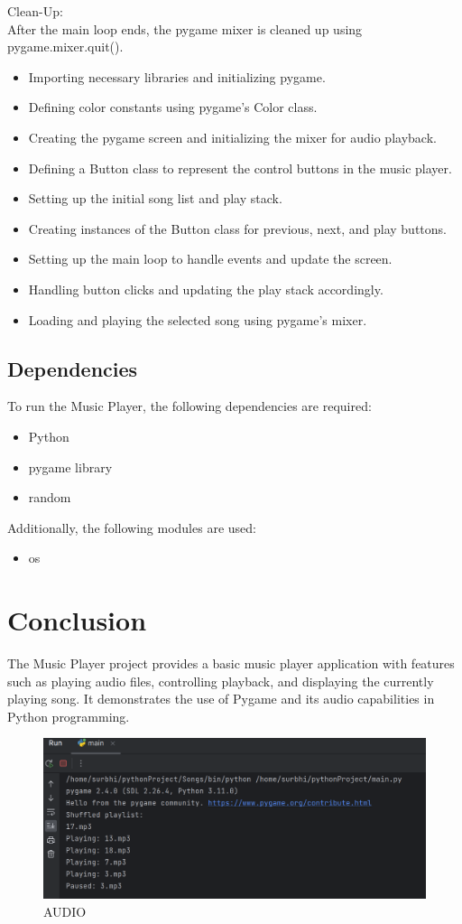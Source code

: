 \documentclass[journal,12pt,twocolumn]{IEEEtran}
\begin{document}
Clean-Up:\\
After the main loop ends, the pygame mixer is cleaned up using pygame.mixer.quit().

\begin{itemize}
\item Importing necessary libraries and initializing pygame.
\item Defining color constants using pygame's Color class.
\item Creating the pygame screen and initializing the mixer for audio playback.
\item Defining a Button class to represent the control buttons in the music player.
\item Setting up the initial song list and play stack.
\item Creating instances of the Button class for previous, next, and play buttons.
\item Setting up the main loop to handle events and update the screen.
\item Handling button clicks and updating the play stack accordingly.
\item Loading and playing the selected song using pygame's mixer.
\end{itemize}

\subsection{Dependencies}
To run the Music Player, the following dependencies are required:

\begin{itemize}
\item Python 
\item pygame library
\item random 
\end{itemize}

Additionally, the following modules are used:

\begin{itemize}
        \item os
\end{itemize}

\section{Conclusion}
The Music Player project provides a basic music player application with features such as playing audio files, controlling playback, and displaying the currently playing song. It demonstrates the use of Pygame and its audio capabilities in Python programming.

\begin{figure}
    \centering
    \includegraphics[width=\linewidth]{audio.png}
    \caption{AUDIO}
    \label{fig:my_label}
\end{figure}
\end{document}
